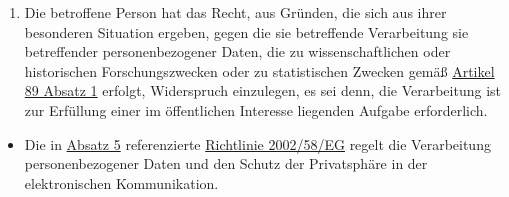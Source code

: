 \begin{enumerate}
  \item Die betroffene Person hat das Recht, aus Gründen, die sich aus ihrer besonderen Situation ergeben, gegen die sie
   betreffende Verarbeitung sie betreffender personenbezogener Daten, die zu wissenschaftlichen oder historischen
   Forschungszwecken oder zu statistischen Zwecken gemäß \hyperref[itm:89-1]{Artikel 89 Absatz 1} erfolgt, Widerspruch
   einzulegen, es sei denn, die Verarbeitung ist zur Erfüllung einer im öffentlichen Interesse liegenden Aufgabe
   erforderlich.
  \label{itm:21-6}

\end{enumerate}


\begin{itemize}

  \item Die in \hyperref[itm:21-5]{Absatz 5} referenzierte
   \href{https://eur-lex.europa.eu/legal-content/DE/TXT/HTML/?uri=CELEX:32002L0058&qid=1659212895940&from=DE}
    {Richtlinie 2002/58/EG} regelt die Verarbeitung personenbezogener Daten und den Schutz der Privatsphäre in der
    elektronischen Kommunikation.

\end{itemize}




